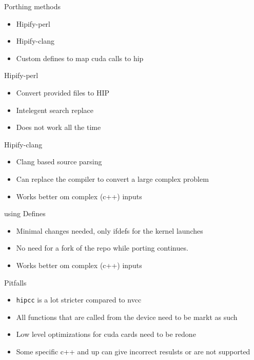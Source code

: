 \documentclass[aspectratio=169]{beamer}
\begin{document}
\begin{frame}{Porthing methods}
\begin{itemize}
    \item Hipify-perl 
    \item Hipify-clang
    \item Custom defines to map cuda calls to hip
\end{itemize}
\end{frame}

\begin{frame}{Hipify-perl}
\begin{itemize}
    \item Convert provided files to HIP
    \item Intelegent search replace
    \item Does not work all the time
\end{itemize}

\end{frame}

\begin{frame}{Hipify-clang}
\begin{itemize}
    \item Clang based source parsing
    \item Can replace the compiler to convert a large complex problem
    \item Works better om complex (c++) inputs
\end{itemize}
\end{frame}

\begin{frame}{using Defines}
\begin{itemize}
    \item Minimal changes needed, only ifdefs for the kernel launches 
    \item No need for a fork of the repo while porting continues.
    \item Works better om complex (c++) inputs
\end{itemize}
\end{frame}

\begin{frame}{Pitfalls}
\begin{itemize}
    \item \texttt{hipcc} is a lot stricter compared to nvcc
    \item All functions that are called from the device need to be markt as such
    \item Low level optimizations for cuda cards need to be redone
    \item Some specific c++ and up can give incorrect resulsts or are not supported
    
\end{itemize}
\end{frame}
\end{document}

